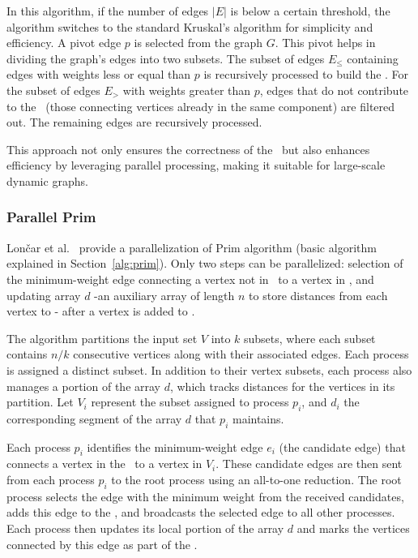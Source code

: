 In this algorithm, if the number of edges $|E|$ is below a certain threshold, the algorithm switches to the standard Kruskal's algorithm for simplicity and efficiency. A pivot edge $p$ is selected from the graph $G$. This pivot helps in dividing the graph's edges into two subsets. The subset of edges $E_{\le}$ containing edges with weights less or equal than $p$ is recursively processed to build the \mst. For the subset of edges $E_{>}$ with weights greater than $p$, edges that do not contribute to the \mst\ (those connecting vertices already in the same component) are filtered out. The remaining edges are recursively processed.

This approach not only ensures the correctness of the \mst\ but also enhances efficiency by leveraging parallel processing, making it suitable for large-scale dynamic graphs. 

\subsubsection{Parallel Prim \label{sec:parallel_prim}}
Lončar et al.~\cite{Lonar2014} provide a parallelization of Prim algorithm (basic algorithm explained in Section~\ref{alg:prim}). Only two steps can be parallelized: selection of the minimum-weight edge connecting a vertex not in \mst\ to a vertex in \mst, and updating array $d$ -an auxiliary array of length $n$ to store distances from each vertex to \mst- after a vertex is added to \mst.

The algorithm partitions the input set $V$ into $k$ subsets, where each subset contains $n/k$ 
consecutive vertices along with their associated edges. Each process is assigned a distinct subset. In addition to their vertex subsets, each process also manages a portion of the array $d$, which tracks distances for the vertices in its partition. Let $V_i$ represent the subset assigned to process $p_i$, and $d_i$ the corresponding segment of the array $d$ that $p_i$ maintains.

Each process $p_i$ identifies the minimum-weight edge $e_i$ (the candidate edge) that connects a vertex in the \mst\ to a vertex in $V_i$. These candidate edges are then sent from each process $p_i$ to the root process using an all-to-one reduction. The root process selects the edge with the minimum weight from the received candidates, adds this edge to the \mst, and broadcasts the selected edge to all other processes. Each process then updates its local portion of the array $d$ and marks the vertices connected by this edge as part of the \mst.

